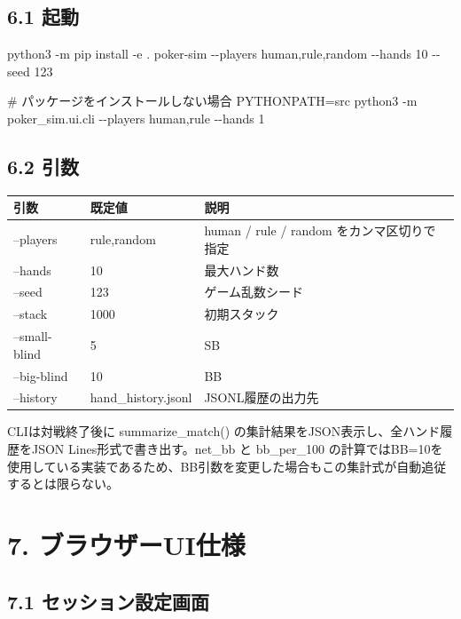 \documentclass[
]{article}
\newenvironment{Shaded}{}{}
\newcommand{\NormalTok}[1]{#1}
\begin{document}
\subsection{6.1 起動}\label{ux8d77ux52d5}

\begin{Shaded}
\begin{Highlighting}[]
\NormalTok{python3 {-}m pip install {-}e .}
\NormalTok{poker{-}sim {-}{-}players human,rule,random {-}{-}hands 10 {-}{-}seed 123}

\NormalTok{\# パッケージをインストールしない場合}
\NormalTok{PYTHONPATH=src python3 {-}m poker\_sim.ui.cli {-}{-}players human,rule {-}{-}hands 1}
\end{Highlighting}
\end{Shaded}

\subsection{6.2 引数}\label{ux5f15ux6570}

\begin{longtable}[]{@{}lll@{}}
\toprule\noalign{}
引数 & 既定値 & 説明 \\
\midrule\noalign{}
\endhead
\bottomrule\noalign{}
\endlastfoot
--players & rule,random & human / rule / random をカンマ区切りで指定 \\
--hands & 10 & 最大ハンド数 \\
--seed & 123 & ゲーム乱数シード \\
--stack & 1000 & 初期スタック \\
--small-blind & 5 & SB \\
--big-blind & 10 & BB \\
--history & hand\_history.jsonl & JSONL履歴の出力先 \\
\end{longtable}

CLIは対戦終了後に summarize\_match()
の集計結果をJSON表示し、全ハンド履歴をJSON Lines形式で書き出す。net\_bb
と bb\_per\_100
の計算ではBB=10を使用している実装であるため、BB引数を変更した場合もこの集計式が自動追従するとは限らない。

\section{7.
ブラウザーUI仕様}\label{ux30d6ux30e9ux30a6ux30b6ux30fcuiux4ed5ux69d8}

\subsection{7.1
セッション設定画面}\label{ux30bbux30c3ux30b7ux30e7ux30f3ux8a2dux5b9aux753bux9762}
\end{document}
